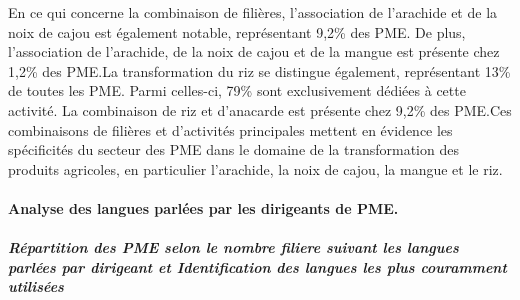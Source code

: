 \documentclass[
]{article}
\begin{document}
\hfill\break
En ce qui concerne la combinaison de filières, l'association de
l'arachide et de la noix de cajou est également notable, représentant
9,2\% des PME. De plus, l'association de l'arachide, de la noix de cajou
et de la mangue est présente chez 1,2\% des PME.La transformation du riz
se distingue également, représentant 13\% de toutes les PME. Parmi
celles-ci, 79\% sont exclusivement dédiées à cette activité. La
combinaison de riz et d'anacarde est présente chez 9,2\% des PME.Ces
combinaisons de filières et d'activités principales mettent en évidence
les spécificités du secteur des PME dans le domaine de la transformation
des produits agricoles, en particulier l'arachide, la noix de cajou, la
mangue et le riz.

\hfill\break

\hypertarget{analyse-des-langues-parluxe9es-par-les-dirigeants-de-pme.}{%
\paragraph{Analyse des langues parlées par les dirigeants de
PME.}\label{analyse-des-langues-parluxe9es-par-les-dirigeants-de-pme.}}

\hfill\break

\hypertarget{ruxe9partition-des-pme-selon-le-nombre-filiere-suivant-les-langues-parluxe9es-par-dirigeant-et-identification-des-langues-les-plus-couramment-utilisuxe9es}{%
\subparagraph{Répartition des PME selon le nombre filiere suivant les
langues parlées par dirigeant et Identification des langues les plus
couramment
utilisées}\label{ruxe9partition-des-pme-selon-le-nombre-filiere-suivant-les-langues-parluxe9es-par-dirigeant-et-identification-des-langues-les-plus-couramment-utilisuxe9es}}

\hfill\break
\end{document}
